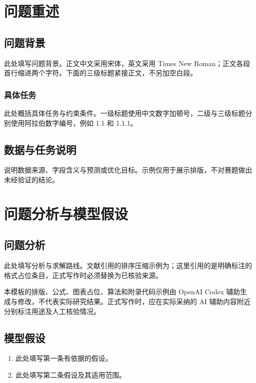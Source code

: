 \section{问题重述}
\subsection{问题背景}
此处填写问题背景。正文中文采用宋体，英文采用 Times New Roman；正文各段首行缩进两个字符。下面的三级标题紧接正文，不另加空白段。
\subsubsection{具体任务}
此处概括具体任务与约束条件。一级标题使用中文数字加顿号，二级与三级标题分别使用阿拉伯数字编号，例如 1.1 和 1.1.1。
\subsection{数据与任务说明}
说明数据来源、字段含义与预测或优化目标。示例仅用于展示排版，不对赛题做出未经验证的结论。

\section{问题分析与模型假设}
\subsection{问题分析}
此处填写分析与求解路线。文献引用的排序压缩示例为\citep{sample-c,sample-a,sample-b}；这里引用的是明确标注的格式占位条目，正式写作时必须替换为已核验来源。

本模板的排版、公式、图表占位、算法和附录代码示例由 OpenAI Codex 辅助生成与修改\citep{ai-codex}，不代表实际研究结果。正式写作时，应在实际采纳的 AI 辅助内容附近分别标注用途及人工核验情况。
\subsection{模型假设}
\begin{enumerate}
  \item 此处填写第一条有依据的假设。
  \item 此处填写第二条假设及其适用范围。
\end{enumerate}

